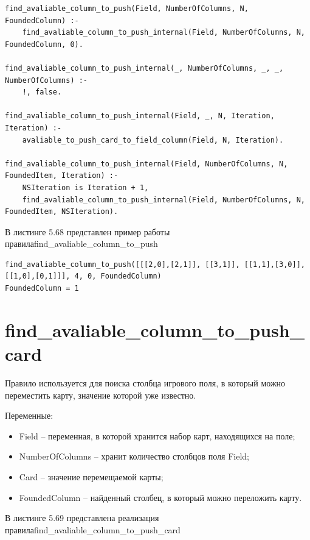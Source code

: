 \documentclass[12pt]{report}
\begin{document}
\begin{lstlisting}[label=some-code, caption=реализация правила find\_avaliable\_column\_to\_push] find_avaliable_column_to_push(Field, NumberOfColumns, N, FoundedColumn) :-
	find_avaliable_column_to_push_internal(Field, NumberOfColumns, N, FoundedColumn, 0).

find_avaliable_column_to_push_internal(_, NumberOfColumns, _, _, NumberOfColumns) :-
	!, false.

find_avaliable_column_to_push_internal(Field, _, N, Iteration, Iteration) :-
	avaliable_to_push_card_to_field_column(Field, N, Iteration).

find_avaliable_column_to_push_internal(Field, NumberOfColumns, N, FoundedItem, Iteration) :-
	NSIteration is Iteration + 1,
	find_avaliable_column_to_push_internal(Field, NumberOfColumns, N, FoundedItem, NSIteration).

\end{lstlisting}
В листинге 5.68 представлен пример работы правила\newline find\_avaliable\_column\_to\_push

\begin{lstlisting}[label=some-code, caption=реализация правила find\_avaliable\_column\_to\_push] 
find_avaliable_column_to_push([[[2,0],[2,1]], [[3,1]], [[1,1],[3,0]], [[1,0],[0,1]]], 4, 0, FoundedColumn)
FoundedColumn = 1
\end{lstlisting}
\section{find\_avaliable\_column\_to\_push\_card}
Правило используется для поиска столбца игрового поля, в который можно переместить карту, значение которой уже известно. 

Переменные:
\begin{itemize}
\item Field – переменная, в которой хранится набор карт, находящихся на поле;
\item NumberOfColumns – хранит количество столбцов поля Field;
\item Card – значение перемещаемой карты;
\item FoundedColumn – найденный столбец, в который можно переложить карту.
\end{itemize}

В листинге 5.69 представлена реализация правила\newline find\_avaliable\_column\_to\_push\_card
\end{document}
